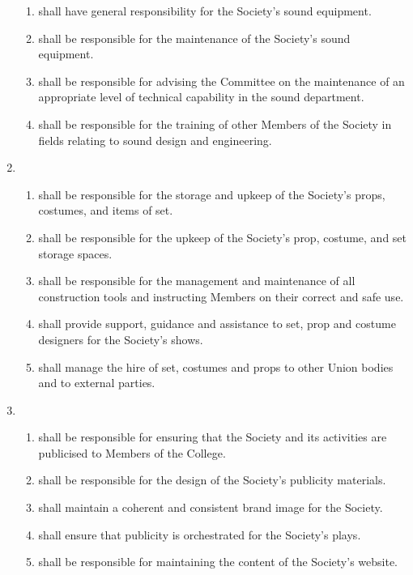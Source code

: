 \documentclass[a4paper]{tufte-handout}
\begin{document}
\begin{enumerate}[resume]
        \begin{enumerate}
            \item shall have general responsibility for the Society's sound equipment.
            \item shall be responsible for the maintenance of the Society's sound equipment.
            \item shall be responsible for advising the Committee on the maintenance of an appropriate level of technical capability in the sound department.
            \item shall be responsible for the training of other Members of the Society in fields relating to sound design and engineering.
        \end{enumerate}
    \item {}
        \begin{enumerate}
            \item shall be responsible for the storage and upkeep of the Society's props, costumes, and items of set.
            \item shall be responsible for the upkeep of the Society's prop, costume, and set storage spaces.
            \item shall be responsible for the management and maintenance of all construction tools and instructing Members on their correct and safe use.
            \item shall provide support, guidance and assistance to set, prop and costume designers for the Society's shows.
            \item shall manage the hire of set, costumes and props to other Union bodies and to external parties.
        \end{enumerate} \pagebreak[2]
    \item {}
        \begin{enumerate}
            \item shall be responsible for ensuring that the Society and its activities are publicised to Members of the College.
            \item shall be responsible for the design of the Society's publicity materials.
            \item shall maintain a coherent and consistent brand image for the Society.
            \item shall ensure that publicity is orchestrated for the Society's plays.
            \item shall be responsible for maintaining the content of the Society's website.

\end{enumerate}
\end{enumerate}
\end{document}
